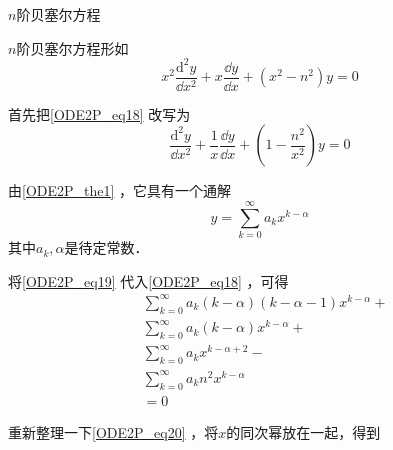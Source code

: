 




\begin{example}{$n$阶贝塞尔方程}

$n$阶贝塞尔方程形如
\begin{equation}\label{ODE2P_eq18}
x^2\frac{\mathrm{d}^2 y}{\dd x^2}+x\frac{\dd y}{\dd x}+(x^2-n^2)y=0
\end{equation}

首先把\autoref{ODE2P_eq18} 改写为
\begin{equation}
\frac{\mathrm{d}^2 y}{\dd x^2}+\frac{1}{x}\frac{\dd y}{\dd x}+(1-\frac{n^2}{x^2})y=0
\end{equation}

由\autoref{ODE2P_the1} ，它具有一个通解
\begin{equation}\label{ODE2P_eq19}
y=\sum\limits_{k=0}^\infty a_kx^{k-\alpha}
\end{equation}
其中$a_k, \alpha$是待定常数．

将\autoref{ODE2P_eq19} 代入\autoref{ODE2P_eq18} ，可得
\begin{equation}\label{ODE2P_eq20}
\begin{aligned}
&\sum\limits^\infty_{k=0}a_k(k-\alpha)(k-\alpha-1)x^{k-\alpha}+\\
&\sum\limits^\infty_{k=0}a_k(k-\alpha)x^{k-\alpha}+\\
&\sum\limits^\infty_{k=0}a_kx^{k-\alpha+2}-\\
&\sum\limits^\infty_{k=0}a_kn^2x^{k-\alpha}\\
&=0
\end{aligned}
\end{equation}

重新整理一下\autoref{ODE2P_eq20} ，将$x$的同次幂放在一起，得到
\begin{equation}

\end{equation}



\end{example}
















